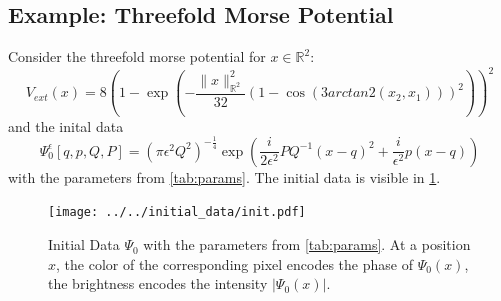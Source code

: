 \documentclass[11pt, a4paper, oneside]{article}
\begin{document}
\subsection{Example: Threefold Morse Potential}
Consider the threefold morse potential for $x \in \mathbb{R}^2$:
\begin{equation*}
  V_{ext}(x) = 8 \left(1 - \exp\left( - \frac{\lVert x \rVert _{\mathbb{R}^2}^2}{32}(1 - \cos(3arctan2(x_2, x_1)))^2\right)\right)^2
\end{equation*}
and the inital data
\begin{equation*}
  \Psi_0^{\epsilon}[q, p, Q, P] = \left( \pi \epsilon^2 Q^2 \right)^{-\frac{1}{4}} \exp \left( \frac{i}{2\epsilon^2} PQ^{-1}(x-q)^2 + \frac{i}{\epsilon^2}p(x-q) \right)
\end{equation*}
 with the parameters from \cref{tab:params}. The initial data is visible in \cref{fig:initwf}.

 \begin{figure}[h]
   \centering
   \texttt{[image: ../../initial\_data/init.pdf]}
   \caption{Initial Data $\Psi_0$ with the parameters from \cref{tab:params}. At a position $x$, the color of the corresponding pixel encodes the phase of $\Psi_0(x)$, the brightness encodes the intensity $\lvert \Psi_0(x) \rvert$.}
   \label{fig:initwf}
 \end{figure}
\end{document}
